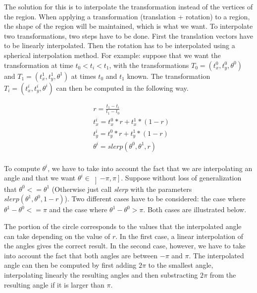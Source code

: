 		The solution for this is to interpolate the transformation instead of the vertices of the region. When applying a transformation (translation + rotation) to a region, the shape of the region will be maintained, which is what we want. To interpolate two transformations, two steps have to be done. First the translation vectors have to be linearly interpolated. Then the rotation has to be interpolated using a spherical interpolation method. For example: suppose that we want the transformation at time \( t_0 < t_i < t_1 \), with the transformations \( T_0 = (t_x^0, t_y^0, \theta^0) \) and \( T_1 = (t_x^1, t_y^1, \theta^1) \) at times \( t_0 \) and \( t_1 \) known. The transformation \( T_i = (t_x^i, t_y^i, \theta^i) \) can then be computed in the following way.

		\begin{equation}
		\begin{split}
			& r = \frac{t_1 - t_i}{t_1 - t_0} \\
			& t_x^i = t_x^0 * r + t_x^1 * (1-r) \\
			& t_y^i = t_y^0 * r + t_y^1 * (1-r) \\	
			& \theta^i = slerp(\theta^0, \theta^1, r) \\
		\end{split}
		\end{equation}

		To compute \( \theta^i \), we have to take into account the fact that we are interpolating an angle and that we want \( \theta^i \in \left ] - \pi , \pi \right ] \). Suppose without loss of generalization that \( \theta^0 <= \theta^1 \) (Otherwise just call \textit{slerp} with the parameters \( slerp(\theta^1, \theta^0, 1-r) \)). Two different cases have to be considered: the case where \( \theta^1 - \theta^0 <= \pi \) and the case where \( \theta^1 - \theta^0 > \pi \). Both cases are illustrated below.
		

		The  portion of the circle corresponds to the values that the interpolated angle can take depending on the value of \( r \). In the first case, a linear interpolation of the angles gives the correct result. In the second case, however, we have to take into account the fact that  both angles are between \( -\pi \) and \( \pi \). The interpolated angle can then be computed by first adding \( 2\pi \) to the smallest angle, interpolating linearly the resulting angles and then substracting \( 2\pi \) from the resulting angle if it is larger than \( \pi \).

